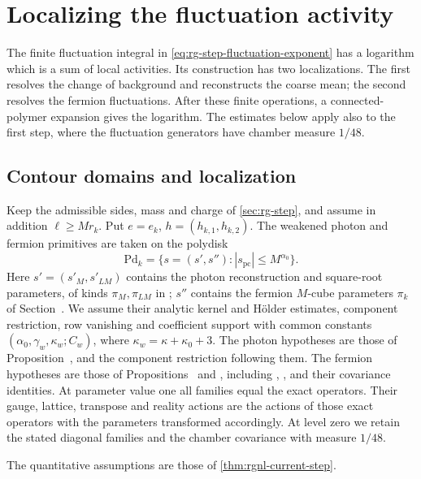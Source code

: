 \section{Localizing the fluctuation activity}\label{sec:rg-nonlinear-step}

The finite fluctuation integral in
\eqref{eq:rg-step-fluctuation-exponent} has a logarithm which is a
sum of local activities. Its construction has two localizations.
The first resolves the change of background and reconstructs
the coarse mean; the second resolves the fermion fluctuations.
After these finite operations, a connected-polymer expansion
gives the logarithm. The estimates below apply also to the first
step, where the fluctuation generators have chamber measure
$1/48$.

\subsection{Contour domains and localization}
\label{subsec:rgnl-domains}

Keep the admissible sides, mass and charge of
\cref{sec:rg-step}, and assume in addition
$\ell\ge Mr_k$. Put $e=e_k$, $h=(h_{k,1},h_{k,2})$.
The weakened photon and fermion primitives are taken on the
polydisk
\[
 \mathrm{Pd}_k=\{s=(s',s''):|s_{\mathrm{pc}}|\le M^{\alpha_0}\}.
\]
Here $s'=(s'_M,s'_{LM})$ contains the photon reconstruction
and square-root parameters, of kinds $\pi_M,\pi_{LM}$ in
; $s''$ contains the
fermion $M$-cube parameters $\pi_k$ of
Section~.
We assume their analytic kernel and H\"older estimates,
component restriction, row vanishing and coefficient support
with common constants $(\alpha_0,\gamma_w,\kappa_w;C_w)$,
where $\kappa_w=\kappa+\kappa_0+3$.
The photon hypotheses are those of
Proposition~,
 and the component
restriction following them. The fermion hypotheses are those of
Propositions~ and
, including
,
, and their covariance
identities. At parameter value one all families equal the
exact operators. Their gauge, lattice, transpose and reality
actions are the actions of those exact operators with the
parameters transformed accordingly. At level zero we retain
the stated diagonal families and the chamber covariance
with measure $1/48$.

The quantitative assumptions are those of \cref{thm:rgnl-current-step}.

